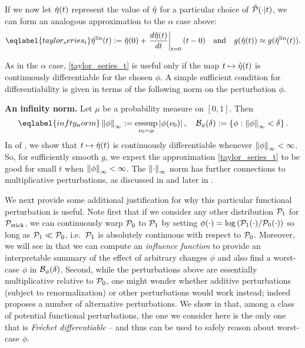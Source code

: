 If we now let $\hat\eta(t)$ represent the value of $\hat\eta$ for a particular
choice of $\tilde{\mathcal{P}}(\cdot \vert t)$, we can form an analogous approximation to the
$\alpha$ case above:
%
\begin{align} \eqlabel{taylor_series_t}
%
\etalin(\t) :=
    \etaopt(0) +
    \fracat{d\etaopt(t)}{dt}{\t=0} (\t - 0)
\mathand
g(\etaopt(\t)) \approx g(\etalin(\t)).
%
\end{align}

As in the $\alpha$ case, \eqref{taylor_series_t} is useful only if the map $t
\mapsto \hat\eta(t)$ is continuously differentiable for the chosen $\phi$. A
simple sufficient condition for differentiability is given in terms of the
following norm on the perturbation $\phi$.

\noindent \textbf{An infinity norm.}
Let $\mu$ be a probability measure on $[0,1]$. Then
\begin{equation} \eqlabel{infty_norm}
	\norminf{\phi} := \esssup_{\nu_0 \sim \mu} \abs{\phi(\nu_0)},
	\quad \ball_\phi(\delta) := \left\{ \phi: \norminf{\phi} <
\delta \right\}.
\end{equation}
%
In  of , we show that
$t \mapsto \hat\eta(t)$ is continuously differentiable whenever $\left\Vert\phi\right\Vert_{\infty} <
\infty$.  So, for sufficiently smooth $g$, we expect the approximation
\eqref{taylor_series_t} to be good for small $t$ when $\left\Vert\phi\right\Vert_{\infty} < \infty$.
The $\left\Vert\cdot\right\Vert_{\infty}$ norm has further connections to multiplicative
perturbations, as discussed in \citep{gustafson:1996:marginal} and later in
.

We next provide some additional justification for why this particular functional
perturbation is useful. Note first that if we consider any other distribution
$\mathcal{P}_{1}$ for $\mathcal{P}_{\mathrm{stick}}$, we can continuously warp $\mathcal{P}_{0}$ to $\mathcal{P}_{1}$ by setting
$\phi(\cdot) = \log \left( \mathcal{P}_{1}(\cdot) / \mathcal{P}_{0}(\cdot) \right)$ so long as
$\mathcal{P}_{1} \ll \mathcal{P}_{0}$, i.e.\ $\mathcal{P}_{1}$ is absolutely continuous with respect to
$\mathcal{P}_{0}$. Moreover, we will see in  that we can
compute an \emph{influence function} to provide an interpretable summary of the
effect of arbitrary changes $\phi$ and also find a worst-case $\phi$ in
$\mathcal{B}_\phi(\delta)$. Second, while the perturbations above are essentially
multiplicative relative to $\mathcal{P}_{0}$, one might wonder whether additive
perturbations (subject to renormalization) or other perturbations would work
instead; indeed \citet{gustafson:1996:local} proposes a number of alternative
perturbations. We show in  that, among a class of
potential functional perturbations, the one we consider here is the only one
that is {\em Fr{\'e}chet differentiable} -- and thus can be used to safely
reason about worst-case $\phi$.

